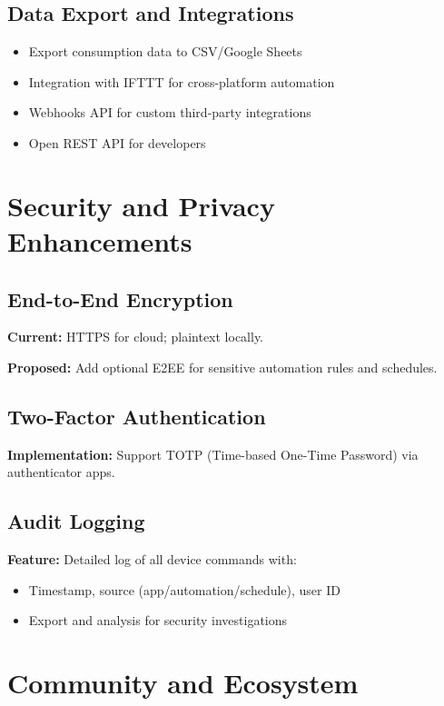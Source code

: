 \subsection{Data Export and Integrations}

\begin{itemize}
    \item Export consumption data to CSV/Google Sheets
    \item Integration with IFTTT for cross-platform automation
    \item Webhooks API for custom third-party integrations
    \item Open REST API for developers
\end{itemize}

\section{Security and Privacy Enhancements}

\subsection{End-to-End Encryption}

\textbf{Current:} HTTPS for cloud; plaintext locally.

\textbf{Proposed:} Add optional E2EE for sensitive automation rules and schedules.

\subsection{Two-Factor Authentication}

\textbf{Implementation:} Support TOTP (Time-based One-Time Password) via authenticator apps.

\subsection{Audit Logging}

\textbf{Feature:} Detailed log of all device commands with:
\begin{itemize}
    \item Timestamp, source (app/automation/schedule), user ID
    \item Export and analysis for security investigations
\end{itemize}

\section{Community and Ecosystem}

